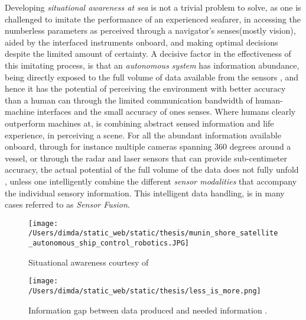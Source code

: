 Developing \emph{situational awareness at sea} is not a trivial problem to solve, as one is challenged to imitate the performance of an experienced seafarer, in accessing the numberless parameters as perceived through a navigator's senses(mostly vision), aided by the interfaced instruments onboard, and making optimal decisions despite the limited amount of certainty. A decisive factor in the effectiveness of this imitating process, is that  an \emph{autonomous system} has information abundance, being directly exposed to the full volume of data available from the sensors , and hence it has the potential of perceiving the environment with better accuracy than a human can through the limited communication bandwidth of human-machine interfaces and the small accuracy of ones senses. Where humans clearly outperform machines at, is combining abstract sensed information and life experience, in perceiving a scene. For all the abundant information available onboard, through for instance multiple cameras spanning 360 degrees around a vessel, or through the radar and laser sensors that can provide sub-centimeter accuracy, the actual potential of the full volume of the data does not  fully unfold , unless one intelligently combine the different \emph{sensor modalities} that accompany the individual sensory information. This intelligent data handling, is in many cases referred to as \emph{Sensor Fusion}.


\begin{figure}[H]
	\centering
	\texttt{[image: /Users/dimda/static\_web/static/thesis/munin\_shore\_satellite\_autonomous\_ship\_control\_robotics.JPG]}
	\caption{Situational awareness courtesy of  \cite{MUNIN}}
	\label{fig:situation}
\end{figure}



\begin{figure}[H]
	\centering
	\texttt{[image: /Users/dimda/static\_web/static/thesis/less\_is\_more.png]}
	\caption{Information gap between data produced and needed information  \cite{Endsley1995}.}
	\label{fig:less_is_more}
\end{figure}

